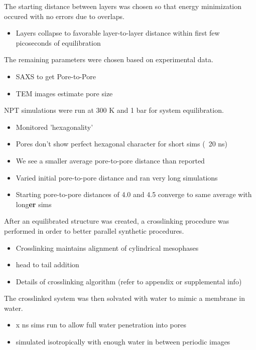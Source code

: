 \documentclass{article}
\begin{document}
	The starting distance between layers was chosen so that energy minimization occured with no errors due to overlaps. 
	\begin{itemize}
		\item Layers collapse to favorable layer-to-layer distance within first few picoseconds of equilibration 
	\end{itemize}
	
	\noindent The remaining parameters were chosen based on experimental data. 
	\begin{itemize}
		\item SAXS to get Pore-to-Pore
		\item TEM images estimate pore size
	\end{itemize}
	
	\noindent NPT simulations were run at 300 K and 1 bar for system equilibration. 
	\begin{itemize}
		\item Monitored 'hexagonality'
		\item Pores don't show perfect hexagonal character for short sims (~20 ns) 
		\item We see a smaller average pore-to-pore distance than reported
		\item Varied initial pore-to-pore distance and ran very long simulations
		\item Starting pore-to-pore distances of 4.0 and 4.5 converge to same average with long\textbf{er} sims 
	\end{itemize}
	
	After an equilibrated structure was created, a crosslinking procedure was performed in order to better parallel synthetic procedures. 
	\begin{itemize}
		\item Crosslinking maintains alignment of cylindrical mesophases
		\item head to tail addition
		\item Details of crosslinking algorithm (refer to appendix or supplemental info)
	\end{itemize}
	
	\noindent The crosslinked system was then solvated with water to mimic a membrane in water.
	\begin{itemize}
		\item x ns sims run to allow full water penetration into pores
		\item simulated isotropically with enough water in between periodic images
	\end{itemize}  
	
\end{document}
